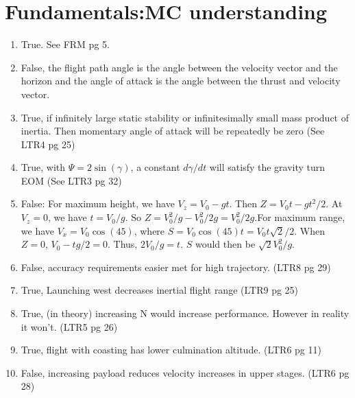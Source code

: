 \section{ Fundamentals:MC understanding }\label{sec:q1}    

\begin{enumerate}
    \item True. See FRM pg 5. 
    \item False, the flight path angle is the angle between the velocity vector and the horizon and the angle of attack is the angle between the thrust and velocity vector.
    \item True, if infinitely large static stability or infinitesimally small mass product of inertia. Then momentary angle of attack will be repeatedly be zero (See LTR4 pg 25)
    \item True, with $\Psi = 2 \sin(\gamma)$, a constant $d\gamma/dt$ will satisfy the gravity turn EOM (See LTR3 pg 32)
    \item False: For maximum height, we have $V_z = V_0 - gt$. Then $Z = V_0 t - gt^2/2$. At $V_z = 0$, we have $t = V_0/g$. So $Z = V_0^2/g - V_0^2/2g = V_0^2/2g$.For maximum range, we have $V_x = V_0 \cos(45)$, where $S = V_0 \cos(45) t = V_0 t\sqrt{2}/2 $. When $Z = 0$, $V_0 - tg/2 = 0$. Thus, $2V_0/g = t$. $S$ would then be $\sqrt{2}V_0^2 /g$. 
    \item False, accuracy requirements easier met for high trajectory. (LTR8 pg 29)
    \item True, Launching west decreases inertial flight range (LTR9 pg 25)
    \item True, (in theory) increasing N would increase performance. However in reality it won't. (LTR5 pg 26)
    \item True, flight with coasting has lower culmination altitude. (LTR6 pg 11)
    \item False, increasing payload reduces velocity increases in upper stages. (LTR6 pg 28)
\end{enumerate}
